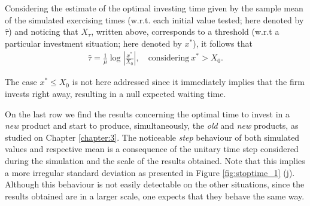 Considering the estimate of the optimal investing time given by the sample mean of the simulated exercising times (w.r.t. each initial value tested; here denoted by $\hat{\tau}$) and noticing that $X_\tau$, written above, corresponds to a threshold (w.r.t a particular investment situation; here denoted by $x^*$), it follows that
\begin{align}
 \hat{\tau}=\frac{1}{\mu} \log \left|  \frac{x^*}{X_0} \right|, \quad \text{considering} \ x^*> X_0.
\end{align}

The case $x^*\leq X_0$ is not here addressed since it immediately implies that the firm invests right away, resulting in a null expected waiting time.





On the last row we find the results concerning the optimal time to invest in a \textit{new} product and start to produce, simultaneously, the \textit{old} and \textit{new} products, as studied on Chapter \ref{chapter:3}.
The noticeable \textit{step} behaviour of both simulated values and respective mean is a consequence of the unitary time step considered during the simulation and the scale of the results obtained. Note that this implies a more irregular standard deviation as presented in Figure \ref{fig:stoptime_1} (j).
Although this behaviour is not easily detectable on the other situations, since the results obtained are in a larger scale, one expects that they behave the same way.


